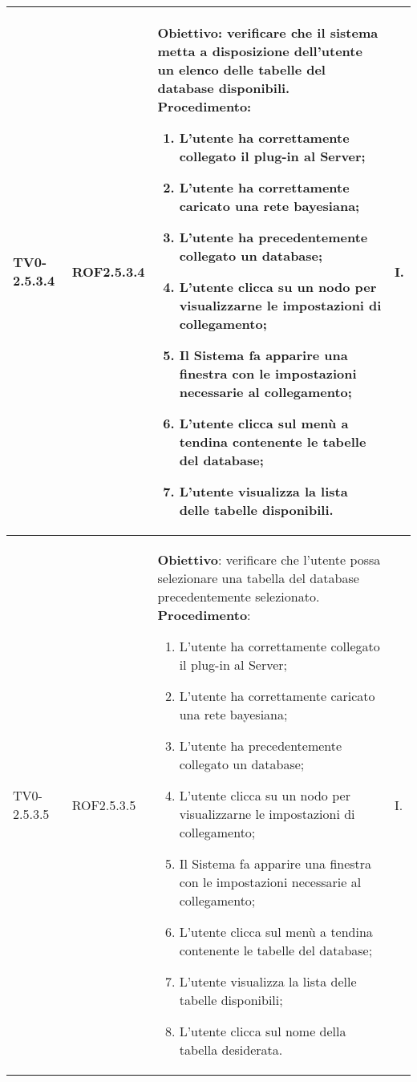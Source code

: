\begin{longtable}{|C{.15\textwidth}|C{.13\textwidth}|m{.52\textwidth}|C{.08\textwidth}|}
TV0-2.5.3.4 & ROF2.5.3.4 &
	\textbf{Obiettivo}: verificare che il sistema metta a disposizione dell'utente un elenco delle tabelle del database disponibili. \newline
	\textbf{Procedimento}:
	\begin{enumerate}
		\item L'utente ha correttamente collegato il plug-in al Server;
		\item L'utente ha correttamente caricato una rete bayesiana;
		\item L'utente ha precedentemente collegato un database;
		\item L'utente clicca su un nodo per visualizzarne le impostazioni di collegamento;
		\item Il Sistema fa apparire una finestra con le impostazioni necessarie al collegamento;
		\item L'utente clicca sul menù a tendina contenente le tabelle del database;
		\item L'utente visualizza la lista delle tabelle disponibili.
			\end{enumerate} & I. \\
\hline

TV0-2.5.3.5 & ROF2.5.3.5 &
	\textbf{Obiettivo}: verificare che l'utente possa selezionare una tabella del database precedentemente selezionato. \newline
	\textbf{Procedimento}:
	\begin{enumerate}
		\item L'utente ha correttamente collegato il plug-in al Server;
		\item L'utente ha correttamente caricato una rete bayesiana;
		\item L'utente ha precedentemente collegato un database;
		\item L'utente clicca su un nodo per visualizzarne le impostazioni di collegamento;
		\item Il Sistema fa apparire una finestra con le impostazioni necessarie al collegamento;
		\item L'utente clicca sul menù a tendina contenente le tabelle del database;
		\item L'utente visualizza la lista delle tabelle disponibili;
		\item L'utente clicca sul nome della tabella desiderata.
			\end{enumerate} & I. \\
\hline


\end{longtable}
